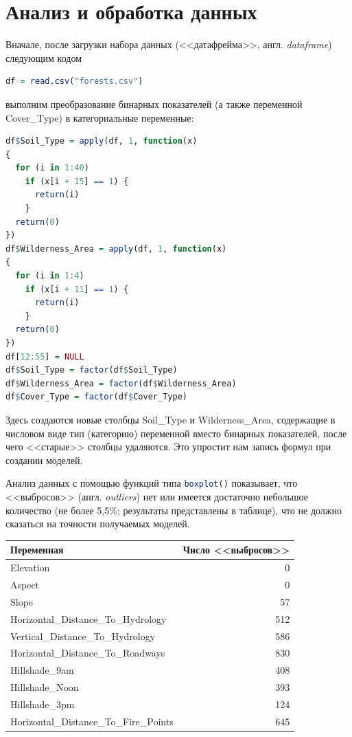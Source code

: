 \documentclass[12pt]{article}
\begin{document}
\section{Анализ и обработка данных}
Вначале, после загрузки набора данных (<<датафрейма>>, англ. \textit{dataframe}) следующим кодом
\begin{lstlisting}[language=r]
df = read.csv("forests.csv")
\end{lstlisting}
выполним преобразование бинарных показателей (а также переменной Cover\_Type) в категориальные переменные:
\begin{lstlisting}[language=r]
df$Soil_Type = apply(df, 1, function(x)
{
  for (i in 1:40)
    if (x[i + 15] == 1) {
      return(i)
    }
  return(0)
})
df$Wilderness_Area = apply(df, 1, function(x)
{
  for (i in 1:4)
    if (x[i + 11] == 1) {
      return(i)
    }
  return(0)
})
df[12:55] = NULL
df$Soil_Type = factor(df$Soil_Type)
df$Wilderness_Area = factor(df$Wilderness_Area)
df$Cover_Type = factor(df$Cover_Type)
\end{lstlisting}
Здесь создаются новые столбцы Soil\_Type и Wilderness\_Area, содержащие в числовом виде тип (категорию) переменной вместо 
бинарных показателей, после чего <<старые>> столбцы удаляются. Это упростит нам запись формул при создании моделей.

Анализ данных с помощью функций типа \lstinline[language=r]|boxplot()| показывает, что <<выбросов>> (англ. \textit{outliers}) нет или
имеется достаточно небольшое количество (не более 5,5\%; результаты представлены в таблице), 
что не должно сказаться на точности получаемых моделей.

\begin{tabular}{|l|r|}
     \hline
     Переменная                             & Число <<выбросов>> \\ \hline
     Elevation                              &                  0 \\
     Aspect                                 &                  0 \\
     Slope                                  &                 57 \\
     Horizontal\_Distance\_To\_Hydrology    &                512 \\
     Vertical\_Distance\_To\_Hydrology      &                586 \\
     Horizontal\_Distance\_To\_Roadways     &                830 \\
     Hillshade\_9am                         &                408 \\
     Hillshade\_Noon                        &                393 \\
     Hillshade\_3pm                         &                124 \\
     Horizontal\_Distance\_To\_Fire\_Points &                645 \\ \hline
\end{tabular}
\end{document}
